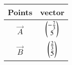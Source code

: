 \begin{tabular}{|c|c|}
\hline 
Points & vector \\
\hline
$\vec{A}$ & $\begin{pmatrix}-\frac{7}{3}\\5\end{pmatrix}$ \\
\hline
$\vec{B}$ & $\begin{pmatrix}\frac{2}{3}\\5\end{pmatrix}$ \\
\hline
\end{tabular}
